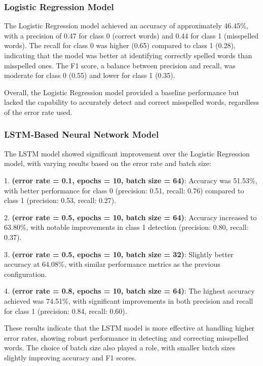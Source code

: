\subsubsection{Logistic Regression Model}

The Logistic Regression model achieved an accuracy of approximately 46.45\%, with a precision of 0.47 for class 0 (correct words) and 0.44 for class 1 (misspelled words). The recall for class 0 was higher (0.65) compared to class 1 (0.28), indicating that the model was better at identifying correctly spelled words than misspelled ones. The F1 score, a balance between precision and recall, was moderate for class 0 (0.55) and lower for class 1 (0.35).

Overall, the Logistic Regression model provided a baseline performance but lacked the capability to accurately detect and correct misspelled words, regardless of the error rate used.

\subsubsection{LSTM-Based Neural Network Model}

The LSTM model showed significant improvement over the Logistic Regression model, with varying results based on the error rate and batch size:

1. \textbf{(error rate = 0.1, epochs = 10, batch size = 64)}: Accuracy was 51.53\%, with better performance for class 0 (precision: 0.51, recall: 0.76) compared to class 1 (precision: 0.53, recall: 0.27).

2. \textbf{(error rate = 0.5, epochs = 10, batch size = 64)}: Accuracy increased to 63.80\%, with notable improvements in class 1 detection (precision: 0.80, recall: 0.37).

3. \textbf{(error rate = 0.5, epochs = 10, batch size = 32)}: Slightly better accuracy at 64.08\%, with similar performance metrics as the previous configuration.

4. \textbf{(error rate = 0.8, epochs = 10, batch size = 64)}: The highest accuracy achieved was 74.51\%, with significant improvements in both precision and recall for class 1 (precision: 0.84, recall: 0.60).

These results indicate that the LSTM model is more effective at handling higher error rates, showing robust performance in detecting and correcting misspelled words. The choice of batch size also played a role, with smaller batch sizes slightly improving accuracy and F1 scores.


